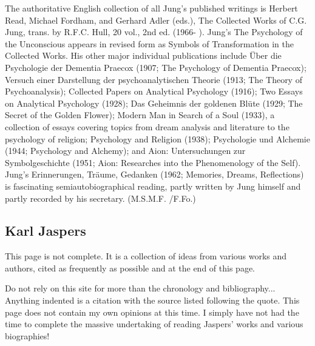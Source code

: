 \documentclass[12pt]{article}
\begin{document}
                                      The authoritative English collection of all Jung's published writings
                                      is Herbert Read, Michael Fordham, and Gerhard Adler (eds.), The
                                      Collected Works of C.G. Jung, trans. by R.F.C. Hull, 20 vol., 2nd ed.
                                      (1966- ). Jung's The Psychology of the Unconscious appears in
                                      revised form as Symbols of Transformation in the Collected Works.
                                      His other major individual publications 
                                      include \"{U}ber die Psychologie
                                      der Dementia Praecox (1907; The Psychology of Dementia Praecox);
                                      Versuch einer Darstellung der psychoanalytischen Theorie (1913;
                                      The Theory of Psychoanalysis); Collected Papers on Analytical
                                      Psychology (1916); Two Essays on Analytical Psychology (1928);
                                      Das Geheimnis der goldenen Bl\"{u}te (1929; The Secret of the Golden
                                      Flower); Modern Man in Search of a Soul (1933), a collection of
                                      essays covering topics from dream analysis and literature to the
                                      psychology of religion; Psychology and Religion (1938); Psychologie
                                      und Alchemie (1944; Psychology and Alchemy); and Aion:
                                      Untersuchungen zur Symbolgeschichte (1951; Aion: Researches into
                                      the Phenomenology of the Self). Jung's Erinnerungen, Tr\"{a}ume,
                                      Gedanken (1962; Memories, Dreams, Reflections) is fascinating
                                      semiautobiographical reading, partly written by Jung himself and
                                      partly recorded by his secretary. (M.S.M.F. /F.Fo.) 
                                      
\subsection{Karl Jaspers}
This page is not complete. It is a collection of ideas from various works and authors, cited as frequently as possible and at the
end of this page. 

Do not rely on this site for more than the chronology and bibliography... Anything indented is a citation with the source listed
following the quote. This page does not contain my own opinions at this time. I simply have not had the time to complete
the massive undertaking of reading Jaspers' works and various biographies! 
\end{document}
